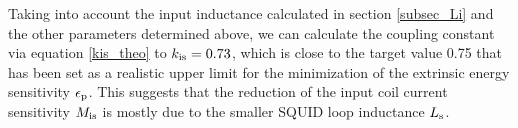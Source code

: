 Taking into account the input inductance calculated in section \ref{subsec_Li} and the other parameters determined above, we can calculate the coupling constant via equation \ref{kis_theo} to $k_{\rm is}=0.73$, which is close to the target value 0.75 that has been set as a realistic upper limit for the minimization of the extrinsic energy sensitivity $\epsilon_{\rm p}$. This suggests that the reduction of the input coil current sensitivity $M_{\rm is}$ is mostly due to the smaller SQUID loop inductance $L_{\rm s}$. 







